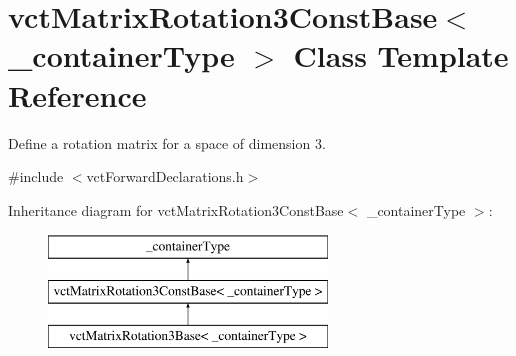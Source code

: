 \hypertarget{classvct_matrix_rotation3_const_base}{}\section{vct\+Matrix\+Rotation3\+Const\+Base$<$ \+\_\+container\+Type $>$ Class Template Reference}
\label{classvct_matrix_rotation3_const_base}


Define a rotation matrix for a space of dimension 3.  




{\ttfamily \#include $<$vct\+Forward\+Declarations.\+h$>$}

Inheritance diagram for vct\+Matrix\+Rotation3\+Const\+Base$<$ \+\_\+container\+Type $>$\+:\begin{figure}[H]
\begin{center}
\leavevmode
\includegraphics[height=3.000000cm]{dd/d34/classvct_matrix_rotation3_const_base}
\end{center}
\end{figure}
